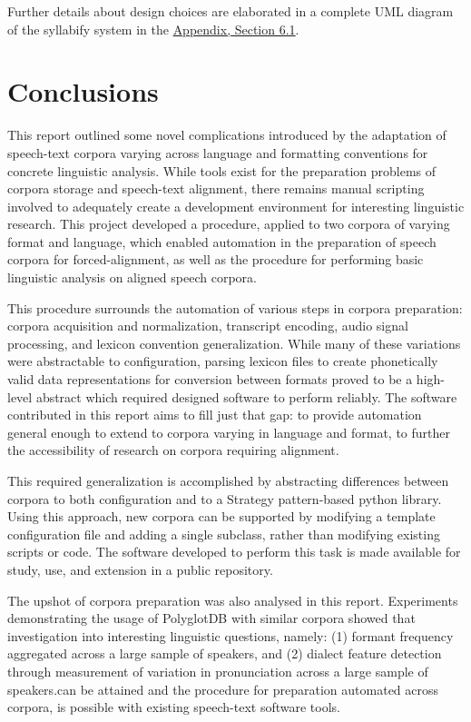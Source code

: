 \documentclass[11pt]{article}
\begin{document}
Further details about design choices are elaborated in a complete UML diagram of the syllabify system in the \hyperlink{section.6}{Appendix, Section 6.1}.

\section{Conclusions}

This report outlined some novel complications introduced by the adaptation of speech-text corpora varying across language and formatting conventions for concrete linguistic analysis. While tools exist for the preparation problems of corpora storage and speech-text alignment, there remains manual scripting involved to adequately create a development environment for interesting linguistic research. This project developed a procedure, applied to two corpora of varying format and language, which enabled automation in the preparation of speech corpora for forced-alignment, as well as the procedure for performing basic linguistic analysis on aligned speech corpora.

This procedure surrounds the automation of various steps in corpora preparation: corpora acquisition and normalization, transcript encoding, audio signal processing, and lexicon convention generalization. While many of these variations were abstractable to configuration, parsing lexicon files to create phonetically valid data representations for conversion between formats proved to be a high-level abstract which required designed software to perform reliably. The software contributed in this report aims to fill just that gap: to provide automation general enough to extend to corpora varying in language and format, to further the accessibility of research on corpora requiring alignment.

This required generalization is accomplished by abstracting differences between corpora to both configuration and to a Strategy pattern-based python library. Using this approach, new corpora can be supported by modifying a template configuration file and adding a single subclass, rather than modifying existing scripts or code. The software developed to perform this task is made available for study, use, and extension in a public repository.

The upshot of corpora preparation was also analysed in this report. Experiments demonstrating the usage of PolyglotDB with similar corpora showed that investigation into interesting linguistic questions, namely: (1) formant frequency aggregated across a large sample of speakers, and (2) dialect feature detection through measurement of variation in pronunciation across a large sample of speakers.can be attained and the procedure for preparation automated across corpora, is possible with existing speech-text software tools.
\end{document}
